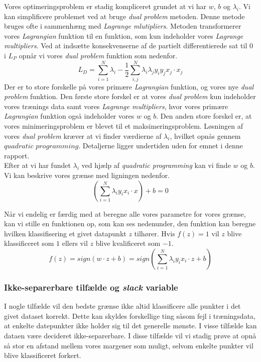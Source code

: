 \documentclass{article}
\begin{document}
Vores optimeringsproblem er stadig kompliceret grundet at vi har $w$, $b$ og $\lambda_i$. Vi kan simplificere problemet ved at bruge \textit{dual problem} metoden. Denne metode bruges ofte i sammenhæng med \textit{Lagrange mlutipliers}. Metoden transformerer vores \textit{Lagrangian} funktion til en funktion, som kun indeholder vores \textit{Lagrange multipliers}. Ved at indsætte konsekvenserne af de partielt differentierede sat til 0 i $L_P$ opnår vi vores \textit{dual problem} funktion som nedenfor.
\begin{equation}
\label{eq:L_D}
L_D = \sum\limits_{i=1}^N \lambda_i - \frac{1}{2}\sum\limits_{i,j}^N \lambda_i \lambda_j y_i y_j x_j \cdot x_j
\end{equation}
Der er to store forskelle på vores primære \textit{Lagrangian} funktion, og vores nye \textit{dual problem} funktion. Den første store forskel er at vores \textit{dual problem} kun indeholder vores trænings data samt vores \textit{Lagrange multipliers}, hvor vores primære \textit{Lagrangian} funktion også indeholder vores $w$ og $b$. Den anden store forskel er, at vores minimeringsproblem  er blevet til et maksimeringsproblem.
Løsningen af vores \textit{dual problem} kræver at vi finder værdierne af $\lambda_i$, hvilket opnås gennem $\textit{quadratic programming}$. Detaljerne ligger undertiden uden for emnet i denne rapport.\\
Efter at  vi har fundet $\lambda_i$ ved hjælp af \textit{quadratic programming} kan vi finde $w$ og $b$. Vi kan beskrive vores grænse med ligningen nedenfor.
\begin{equation}
\label{eq:final_opt}
( \sum\limits_{i=1}^N \lambda_i y_i x_i \cdot x) + b = 0
\end{equation}

Når vi endelig er færdig med at beregne alle vores parametre for vores grænse, kan vi stille en funktionen op, som kan ses nedenunder, den funktion kan beregne hvilken klassifisering et givet datapunkt $z$ tilhører. Hvis $f(z) = 1$ vil $z$ blive klassificeret som $1$ ellers vil $z$ blive kvalificeret som $-1$. 
\begin{equation}
\label{eq:calc_class}
f(z) = sign(w \cdot z + b) = sign( \sum\limits_{i=1}^N \lambda_i y_i x_i \cdot z + b)
\end{equation}

\subsubsection{Ikke-separerbare tilfælde og \textit{slack} variable}
I nogle tilfælde vil den bedste grænse ikke altid klassificere alle punkter i det givet dataset korrekt. Dette kan skyldes forskellige ting såsom fejl i træningsdata, at enkelte datepunkter ikke holder sig til det generelle mønste. I visse tilfælde kan dataen være decideret ikke-separerbare. I disse tilfælde vil vi stadig prøve at opnå så stor en afstand mellem vores margener som muligt, selvom enkelte punkter vil blive klassificeret forkert.
\end{document}
